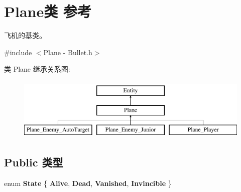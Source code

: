 \hypertarget{class_plane}{}\section{Plane类 参考}
\label{class_plane}


飞机的基类。  




{\ttfamily \#include $<$Plane -\/ Bullet.\+h$>$}

类 Plane 继承关系图\+:\begin{figure}[H]
\begin{center}
\leavevmode
\includegraphics[height=3.000000cm]{class_plane}
\end{center}
\end{figure}
\subsection*{Public 类型}
\begin{DoxyCompactItemize}
\item 
\mbox{\label{class_plane_a18921e108c25d0606ab76d567fcbddf1}} 
enum {\bfseries State} \{ {\bfseries Alive}, 
{\bfseries Dead}, 
{\bfseries Vanished}, 
{\bfseries Invincible}
 \}
\end{DoxyCompactItemize}
